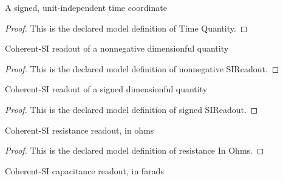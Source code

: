 \begin{definition}
  \label{def:physics:phyx-mini-0942:phyxminiproblems-problemphyxmini0942-timequantity}
  A signed, unit-independent time coordinate
\end{definition}
\begin{proof}
  This is the declared model definition of Time Quantity.
\end{proof}
\begin{definition}
  \label{def:physics:phyx-mini-0942:phyxminiproblems-problemphyxmini0942-nonnegativesireadout}
  Coherent-SI readout of a nonnegative dimensionful quantity
\end{definition}
\begin{proof}
  This is the declared model definition of nonnegative SIReadout.
\end{proof}
\begin{definition}
  \label{def:physics:phyx-mini-0942:phyxminiproblems-problemphyxmini0942-signedsireadout}
  Coherent-SI readout of a signed dimensionful quantity
\end{definition}
\begin{proof}
  This is the declared model definition of signed SIReadout.
\end{proof}
\begin{definition}
  \label{def:physics:phyx-mini-0942:phyxminiproblems-problemphyxmini0942-resistanceinohms}
  Coherent-SI resistance readout, in ohms
\end{definition}
\begin{proof}
  This is the declared model definition of resistance In Ohms.
\end{proof}
\begin{definition}
  \label{def:physics:phyx-mini-0942:phyxminiproblems-problemphyxmini0942-capacitanceinfarads}
  Coherent-SI capacitance readout, in farads
\end{definition}
